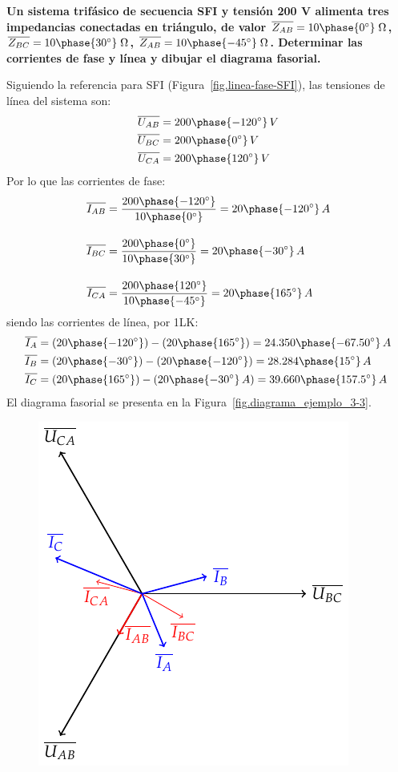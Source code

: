 	\vspace{4mm}
	\begin{example}\label{ej.3-3}
	    \textbf{Un sistema trifásico de secuencia SFI y tensión 200 V alimenta tres impedancias conectadas en triángulo, de valor $\overline{Z_{AB}}=10\phase{0^\circ}\;\Omega$, $\overline{Z_{BC}}=10\phase{30^\circ}\;\Omega$, $\overline{Z_{AB}}=10\phase{-45^\circ}\;\Omega$. Determinar las corrientes de fase y línea y dibujar el diagrama fasorial.}
	    
	    Siguiendo la referencia para SFI (Figura~\ref{fig.linea-fase-SFI}), las tensiones de línea del sistema son:
	    \begin{align*}
	        \overline{U_{AB}}&=200\phase{-120^\circ}\,V\\
	        \overline{U_{BC}}&=200\phase{0^\circ}\,V\\
	        \overline{U_{CA}}&=200\phase{120^\circ}\,V
	    \end{align*}
	    Por lo que las corrientes de fase:
	    \begin{align*}
	        \overline{I_{AB}} &= \frac{200\phase{-120^\circ}}{10\phase{0^\circ}} =20\phase{-120^\circ} \,A \\[10pt]
          \overline{I_{BC}} &= \frac{200\phase{0^\circ}}{10\phase{30^\circ}} = 20\phase{-30^\circ} \,A\\[10pt]
          \overline{I_{CA}} &=\frac{200\phase{120^\circ}}{10\phase{-45^\circ}} = 20\phase{165^\circ} \,A
	    \end{align*}
	    siendo las corrientes de línea, por 1LK:
	    \begin{align*}
	     \overline{I_A}&=(20\phase{-120^\circ})-(20\phase{165^\circ})=24.350\phase{-67.50^\circ}\,A\\	        \overline{I_B}&=(20\phase{-30^\circ})-(20\phase{-120^\circ})=28.284\phase{15^\circ}\,A\\
	    \overline{I_C}&=(20\phase{165^\circ})-(20\phase{-30^\circ} \,A)=39.660\phase{157.5^\circ}\,A
	    \end{align*}
	    El diagrama fasorial se presenta en la Figura~\ref{fig.diagrama_ejemplo_3-3}. 
	    \begin{figure}[H]
	        \centering
	        \includegraphics{../figs/diagrama_3_3.pdf}

\end{figure}
\end{example}
